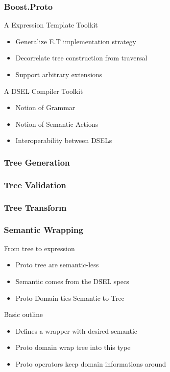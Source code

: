 \begin{frame}
\frametitle{Boost.Proto}
\begin{block}{A Expression Template Toolkit}
\begin{itemize}
\item Generalize E.T implementation strategy
\item Decorrelate tree construction from traversal
\item Support arbitrary extensions
\end{itemize}
\end{block}{}

\begin{block}{A DSEL Compiler Toolkit}
\begin{itemize}
\item Notion of \alert{Grammar}
\item Notion of \alert{Semantic Actions}
\item Interoperability between DSELs
\end{itemize}
\end{block}{}
\end{frame}

\begin{frame}
\frametitle{Tree Generation}
\end{frame}

\begin{frame}
\frametitle{Tree Validation}
\lstprotomatch
\end{frame}

\begin{frame}
\frametitle{Tree Transform}
\lstprotoeval
\end{frame}

\begin{frame}
\frametitle{Semantic Wrapping}
\begin{block}{From tree to expression}
\begin{itemize}
\item Proto tree are semantic-less
\item Semantic comes from the DSEL specs
\item Proto Domain ties Semantic to Tree
\end{itemize}
\end{block}{}

\begin{block}{Basic outline}
\begin{itemize}
\item Defines a wrapper with desired semantic
\item Proto domain wrap tree into this type
\item Proto operators keep domain informations around
\end{itemize}
\end{block}{}
\end{frame}


